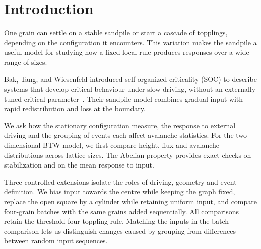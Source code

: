 \chapter{Introduction}\label{sec:intro}
One grain can settle on a stable sandpile or start a cascade of topplings, depending on the configuration it encounters. This variation makes the sandpile a useful model for studying how a fixed local rule produces responses over a wide range of sizes.

Bak, Tang, and Wiesenfeld introduced self-organized criticality (SOC) to describe systems that develop critical behaviour under slow driving, without an externally tuned critical parameter~\cite{bak1987,bak1988}. Their sandpile model combines gradual input with rapid redistribution and loss at the boundary.

We ask how the stationary configuration measure, the response to external driving and the grouping of events each affect avalanche statistics. For the two-dimensional BTW model, we first compare height, flux and avalanche distributions across lattice sizes. The Abelian property provides exact checks on stabilization and on the mean response to input.

Three controlled extensions isolate the roles of driving, geometry and event definition. We bias input towards the centre while keeping the graph fixed, replace the open square by a cylinder while retaining uniform input, and compare four-grain batches with the same grains added sequentially. All comparisons retain the threshold-four toppling rule. Matching the inputs in the batch comparison lets us distinguish changes caused by grouping from differences between random input sequences.
